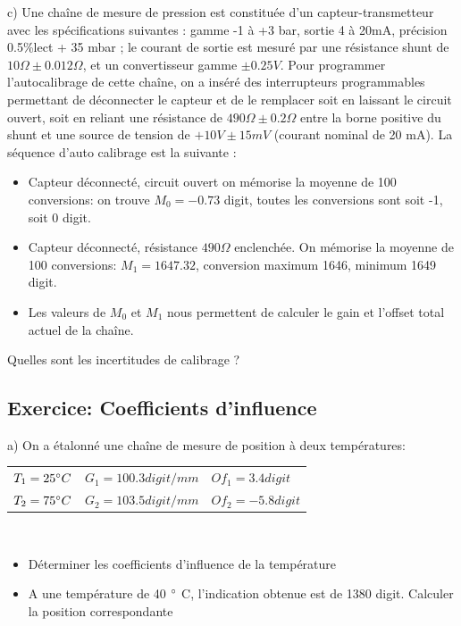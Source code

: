 c)	Une chaîne de mesure de pression est constituée d'un capteur-transmetteur avec les spécifications suivantes : gamme -1 à +3 bar, sortie 4 à 20mA, précision 0.5\%lect + 35 mbar ; le courant de sortie est mesuré par une résistance shunt de $10 \Omega \pm 0.012 \Omega$, et un convertisseur gamme $\pm 0.25V$.
Pour programmer l'autocalibrage de cette chaîne, on a inséré des interrupteurs programmables permettant de déconnecter le capteur et de le remplacer soit en laissant le circuit ouvert, soit en reliant une résistance de $490 \Omega \pm 0.2 \Omega$ entre la borne positive du shunt et une source de tension de $+10V \pm 15mV$ (courant nominal de 20 mA). La séquence d'auto calibrage est la suivante :
\begin{itemize}
    \item Capteur déconnecté, circuit ouvert on mémorise la moyenne de 100 conversions: on trouve $M_0=-0.73$ digit, toutes les conversions sont soit -1, soit 0 digit.
    \item Capteur déconnecté, résistance $490 \Omega$ enclenchée. On mémorise la moyenne de 100 conversions: $M_1=1647.32$, conversion maximum 1646, minimum 1649 digit.
    \item Les valeurs de $M_0$ et $M_1$ nous permettent de calculer le gain et l'offset total actuel de la chaîne.
\end{itemize}

Quelles sont les incertitudes de calibrage ?

\subsection{Exercice: Coefficients d'influence}

a)	On a étalonné une chaîne de mesure de position à deux températures:


\begin {center}
\begin{tabular}{lll}
    $T_1=25 \degree C$ & $G_1= 100.3 digit/mm$  & $Of_1 = 3.4 digit$  \\
    $T_2=75 \degree C$ & $G_2 = 103.5 digit/mm$ & $Of_2 = -5.8 digit$ \\
\end{tabular}
\end{center}
~\\
\begin{itemize}
    \item Déterminer les coefficients d'influence de la température
    \item A une température de 40 $\degree$ C, l'indication obtenue est de 1380 digit. Calculer la position correspondante
\end{itemize}
~\\


